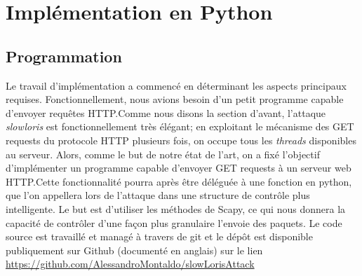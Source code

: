 \documentclass{article}
\begin{document}
\section{Implémentation en Python}

\subsection{Programmation}
Le travail d'implémentation a commencé en déterminant les aspects principaux requises. Fonctionnellement, nous avions
besoin d'un petit programme capable d’envoyer requêtes HTTP.Comme nous disons la section d'avant,
l'attaque \textit{slowloris} est fonctionnellement très élégant; en exploitant le mécanisme des GET
requests du protocole HTTP plusieurs fois, on occupe tous les \textit{threads} disponibles au serveur.
Alors, comme le but de notre état de l'art, on a fixé l'objectif d’implémenter un programme capable d'envoyer
GET requests à un serveur web HTTP.Cette fonctionnalité pourra après être déléguée à une fonction en python,
que l'on appellera lors de l'attaque dans une structure de contrôle plus intelligente.
Le but est d'utiliser les méthodes de Scapy, ce qui nous donnera la capacité de contrôler d'une façon plus granulaire
l'envoie des paquets. Le code source est travaillé et managé à travers de
git et le dépôt est disponible publiquement sur Github (documenté en anglais) sur le lien \href{https://github.com/AlessandroMontaldo/slowLorisAttack}{https://github.com/AlessandroMontaldo/slowLorisAttack}
\end{document}
